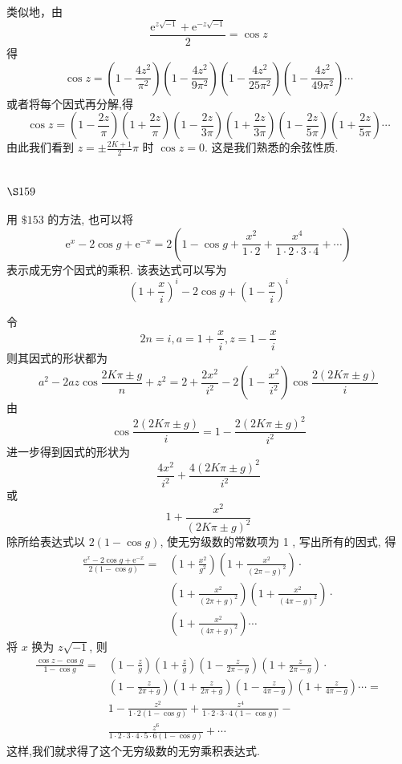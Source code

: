 类似地，由
\[
\frac{\mathrm{e}^{z \sqrt{-1}}+\mathrm{e}^{-z \sqrt{-1}}}{2}=\cos z
\]
得
\[
\cos z=\left(1-\frac{4 z^{2}}{\pi^{2}}\right)\left(1-\frac{4 z^{2}}{9 \pi^{2}}\right)\left(1-\frac{4 z^{2}}{25 \pi^{2}}\right)\left(1-\frac{4 z^{2}}{49 \pi^{2}}\right) \cdots
\]
或者将每个因式再分解,得
\[
\cos z=\left(1-\frac{2 z}{\pi}\right)\left(1+\frac{2 z}{\pi}\right)\left(1-\frac{2 z}{3 \pi}\right)\left(1+\frac{2 z}{3 \pi}\right)\left(1-\frac{2 z}{5 \pi}\right)\left(1+\frac{2 z}{5 \pi}\right) \cdots
\]
由此我们看到 $z=\pm \frac{2 K+1}{2} \pi$ 时 $\cos z=0$. 这是我们熟悉的余弦性质.

\section{$\S 159$}

用 $\$ 153$ 的方法, 也可以将
\[
\mathrm{e}^{x}-2 \cos g+\mathrm{e}^{-x}=2\left(1-\cos g+\frac{x^{2}}{1 \cdot 2}+\frac{x^{4}}{1 \cdot 2 \cdot 3 \cdot 4}+\cdots\right)
\]
表示成无穷个因式的乘积. 该表达式可以写为
\[
\left(1+\frac{x}{i}\right)^{i}-2 \cos g+\left(1-\frac{x}{i}\right)^{i}
\]

令
\[
2 n=i, a=1+\frac{x}{i}, z=1-\frac{x}{i}
\]
则其因式的形状都为
\[
a^{2}-2 a z \cos \frac{2 K \pi \pm g}{n}+z^{2}=2+\frac{2 x^{2}}{i^{2}}-2\left(1-\frac{x^{2}}{i^{2}}\right) \cos \frac{2(2 K \pi \pm g)}{i}
\]
由
\[
\cos \frac{2(2 K \pi \pm g)}{i}=1-\frac{2(2 K \pi \pm g)^{2}}{i^{2}}
\]
进一步得到因式的形状为
\[
\frac{4 x^{2}}{i^{2}}+\frac{4(2 K \pi \pm g)^{2}}{i^{2}}
\]
或
\[
1+\frac{x^{2}}{(2 K \pi \pm g)^{2}}
\]
除所给表达式以 $2(1-\cos g)$, 使无穷级数的常数项为 1 , 写出所有的因式, 得
\[
\begin{aligned}
\frac{\mathrm{e}^{x}-2 \cos g+\mathrm{e}^{-x}}{2(1-\cos g)}= & \left(1+\frac{x^{2}}{g^{2}}\right)\left(1+\frac{x^{2}}{(2 \pi-g)^{2}}\right) \cdot \\
& \left(1+\frac{x^{2}}{(2 \pi+g)^{2}}\right)\left(1+\frac{x^{2}}{(4 \pi-g)^{2}}\right) \cdot \\
& \left(1+\frac{x^{2}}{(4 \pi+g)^{2}}\right) \cdots
\end{aligned}
\]
将 $x$ 换为 $z \sqrt{-1}$, 则
\[
\begin{aligned}
\frac{\cos z-\cos g}{1-\cos g}= & \left(1-\frac{z}{g}\right)\left(1+\frac{z}{g}\right)\left(1-\frac{z}{2 \pi-g}\right)\left(1+\frac{z}{2 \pi-g}\right) \cdot \\
& \left(1-\frac{z}{2 \pi+g}\right)\left(1+\frac{z}{2 \pi+g}\right)\left(1-\frac{z}{4 \pi-g}\right)\left(1+\frac{z}{4 \pi-g}\right) \cdots= \\
& 1-\frac{z^{2}}{1 \cdot 2(1-\cos g)}+\frac{z^{4}}{1 \cdot 2 \cdot 3 \cdot 4(1-\cos g)}- \\
& \frac{z^{6}}{1 \cdot 2 \cdot 3 \cdot 4 \cdot 5 \cdot 6(1-\cos g)}+\cdots
\end{aligned}
\]
这样,我们就求得了这个无穷级数的无穷乘积表达式.

